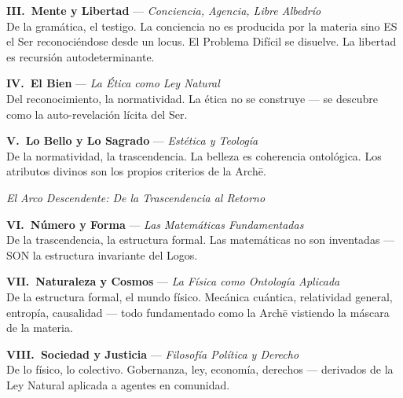 \documentclass[10pt, openany, oneside]{book}
\begin{document}
\noindent \textbf{III.\ Mente y Libertad} --- \textit{Conciencia, Agencia, Libre Albedrío}\\
De la gramática, el testigo. La conciencia no es producida por la materia sino ES el Ser reconociéndose desde un locus. El Problema Difícil se disuelve. La libertad es recursión autodeterminante.

\vspace{0.5em}

\noindent \textbf{IV.\ El Bien} --- \textit{La Ética como Ley Natural}\\
Del reconocimiento, la normatividad. La ética no se construye --- se descubre como la auto-revelación lícita del Ser.

\vspace{0.5em}

\noindent \textbf{V.\ Lo Bello y Lo Sagrado} --- \textit{Estética y Teología}\\
De la normatividad, la trascendencia. La belleza es coherencia ontológica. Los atributos divinos son los propios criterios de la Arch\={e}.

\vspace{1.5em}

\begin{center}
    \itshape El Arco Descendente: De la Trascendencia al Retorno
\end{center}

\vspace{0.5em}

\noindent \textbf{VI.\ Número y Forma} --- \textit{Las Matemáticas Fundamentadas}\\
De la trascendencia, la estructura formal. Las matemáticas no son inventadas --- SON la estructura invariante del Logos.

\vspace{0.5em}

\noindent \textbf{VII.\ Naturaleza y Cosmos} --- \textit{La Física como Ontología Aplicada}\\
De la estructura formal, el mundo físico. Mecánica cuántica, relatividad general, entropía, causalidad --- todo fundamentado como la Arch\={e} vistiendo la máscara de la materia.

\vspace{0.5em}

\noindent \textbf{VIII.\ Sociedad y Justicia} --- \textit{Filosofía Política y Derecho}\\
De lo físico, lo colectivo. Gobernanza, ley, economía, derechos --- derivados de la Ley Natural aplicada a agentes en comunidad.
\end{document}
